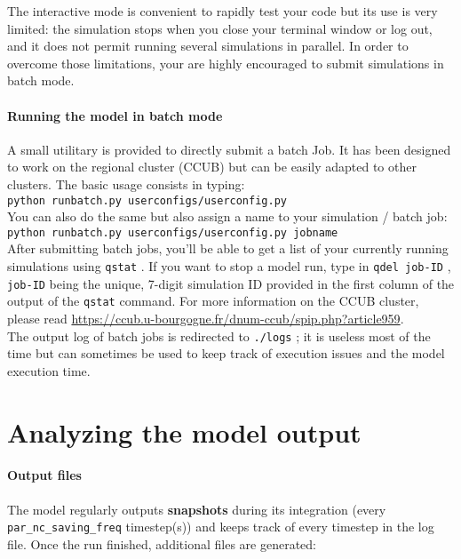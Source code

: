 \documentclass[a4paper, 11pt]{article}
\newcommand\code[1]{%
\texttt{#1}%
}
\begin{document}
The interactive mode is convenient to rapidly test your code but its use is very limited: the simulation stops when you close your terminal window or log out, and it does not permit running several simulations in parallel. In order to overcome those limitations, your are highly encouraged to submit simulations in batch mode.

\paragraph{Running the model in batch mode}A small utilitary is provided to directly submit a batch Job. It has been designed to work on the regional cluster (CCUB) but can be easily adapted to other clusters. The basic usage consists in typing: \\ 

\code{python runbatch.py userconfigs/userconfig.py}\\

You can also do the same but also assign a name to your simulation / batch job: \\

\code{python runbatch.py userconfigs/userconfig.py jobname}\\

After submitting batch jobs, you'll be able to get a list of your currently running simulations using \code{qstat}. If you want to stop a model run, type in \code{qdel job-ID}, \code{job-ID} being the unique, 7-digit simulation ID provided in the first column of the output of the \code{qstat} command. For more information on the CCUB cluster, please read \url{https://ccub.u-bourgogne.fr/dnum-ccub/spip.php?article959}.\\

The output log of batch jobs is redirected to \code{./logs}; it is useless most of the time but can sometimes be used to keep track of execution issues and the model execution time.

\section{Analyzing the model output}

\paragraph{Output files}The model regularly outputs \textbf{snapshots} during its integration (every \code{par\_nc\_saving\_freq} timestep(s)) and keeps track of every timestep in the log file. Once the run finished, additional files are generated:
\end{document}
